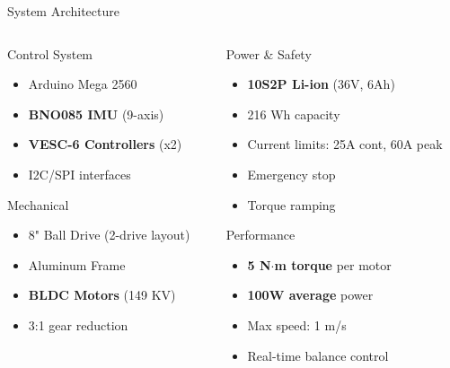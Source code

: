 \documentclass[aspectratio=169]{beamer}
\begin{document}
\begin{frame}{System Architecture}
\begin{columns}[T]
\begin{column}{0.48\textwidth}
\begin{block}{Control System}
\begin{itemize}
    \item Arduino Mega 2560
    \item \textbf{BNO085 IMU} (9-axis)
    \item \textbf{VESC-6 Controllers} (x2)
    \item I2C/SPI interfaces
\end{itemize}
\end{block}

\begin{block}{Mechanical}
\begin{itemize}
    \item 8" Ball Drive (2-drive layout)
    \item Aluminum Frame
    \item \textbf{BLDC Motors} (149 KV)
    \item 3:1 gear reduction
\end{itemize}
\end{block}
\end{column}

\begin{column}{0.48\textwidth}
\begin{block}{Power \& Safety}
\begin{itemize}
    \item \textbf{10S2P Li-ion} (36V, 6Ah)
    \item 216 Wh capacity
    \item Current limits: 25A cont, 60A peak
    \item Emergency stop
    \item Torque ramping
\end{itemize}
\end{block}

\vspace{0.3cm}
\begin{block}{Performance}
\begin{itemize}
    \item \textbf{5 N$\cdot$m torque} per motor
    \item \textbf{100W average} power
    \item Max speed: 1 m/s
    \item Real-time balance control
\end{itemize}
\end{block}
\end{column}
\end{columns}
\end{frame}
\end{document}
